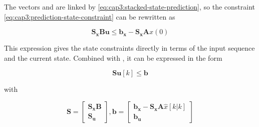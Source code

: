 The vectors  and  are linked by 
\eqref{eq:cap3:stacked-state-prediction}, so the constraint \eqref{eq:cap3:prediction-state-constraint} can be rewritten as

\noindent
\begin{equation}
	\mathbf{S_x} \mathbf{B} \mathbf{u} \le \mathbf{b_x} - \mathbf{S_x} \mathbf{A} x(0)
\end{equation}

This expression gives the state constraints directly in terms of the input sequence and the current state. Combined with , it can be expressed in the form

\noindent
\begin{equation}
	\mathbf{S} \mathbf{u}[k] \le \mathbf{b}
\end{equation}

\noindent
with

\noindent
\begin{equation}
	\mathbf{S} = \left[ \begin{matrix} \mathbf{S_x} \mathbf{B} \\ \mathbf{S_u} \end{matrix} \right], \mathbf{b} = 
	\left[ \begin{matrix} \mathbf{b_x} - \mathbf{S_x} \mathbf{A} \hat{x}[k|k] \\ \mathbf{b_u} \end{matrix} \right]
\end{equation}
